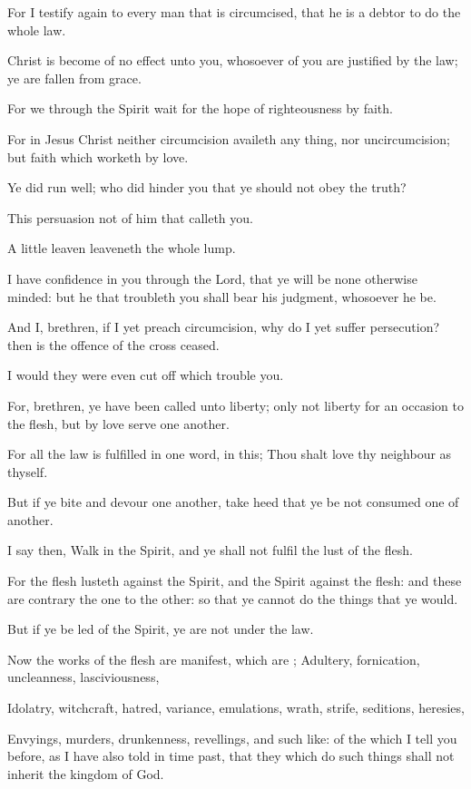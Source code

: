 {For I
testify
again to
every
man that is
circumcised,
that he
is a
debtor to
do
the
whole
law.

Christ is
become
of no effect unto
you,
whosoever of you are
justified
by the
law; ye are fallen
from
grace.

For
we through the
Spirit wait
for the
hope of
righteousness
by
faith.

For
in
Jesus
Christ
neither
circumcision
availeth
any thing,
nor
uncircumcision;
but
faith which
worketh
by
love.

Ye did
run
well;
who did
hinder
you that ye
should
not
obey the
truth?

This
persuasion
{}
not
of him
that
calleth
you.

A
little
leaven
leaveneth
the
whole
lump.

I have
confidence
in
you
through the
Lord,
that ye will
be
none
otherwise
minded:
but he
that
troubleth
you shall
bear
his
judgment,
whosoever he
be.

And
I,
brethren,
if
I
yet
preach
circumcision,
why do
I
yet suffer
persecution?
then
is the
offence of the
cross
ceased.

I
would they
were
even cut
off
which
trouble
you.

For,
brethren,
ye have been
called
unto
liberty;
only
{}
not
liberty
for an
occasion to the
flesh,
but
by
love
serve one
another.

For
all the
law is
fulfilled
in
one
word,
{}
in
this; Thou shalt
love
thy
neighbour
as
thyself.

But
if ye
bite
and
devour one
another, take
heed that ye
be
not
consumed
one
of
another.

 I
say
then,
Walk in the
Spirit,
and ye
shall
not
fulfil the
lust of the
flesh.

For the
flesh
lusteth
against the
Spirit,
and the
Spirit
against the
flesh:
and
these are
contrary the one to the
other: so
that
ye
cannot
do the
things
that ye
would.

But
if ye be
led of the
Spirit, ye
are
not
under the
law.

Now the
works of the
flesh
are
manifest,
which
are
{};
Adultery,
fornication,
uncleanness,
lasciviousness,

Idolatry,
witchcraft,
hatred,
variance,
emulations,
wrath,
strife,
seditions,
heresies,

Envyings,
murders,
drunkenness,
revellings,
and
such
like: of the
which I
tell
you
before,
as I
have
also
told
{} in time past,
that they
which
do such
things
shall
not
inherit the
kingdom of
God.

}
